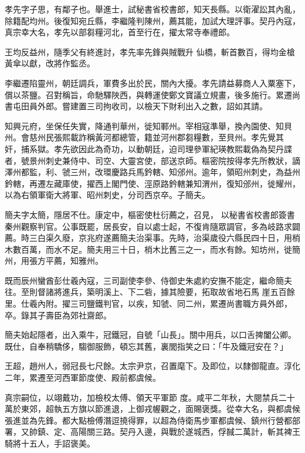 \begin{pinyinscope}
 孝先字子思，有鄰子也。舉進士，試秘書省校書郎，知天長縣。以衛濯訟其內亂，除籍配均州。後復知宛丘縣，李繼隆判陳州，薦其能，加試大理評事。契丹內寇，真宗幸大名，孝先以部芻糧河北，首至行在，擢太常寺奉禮郎。



 王均反益州，隨季父有終進討，孝先率先鋒與賊戰升
 仙橋，斬首數百，得均金槍黃傘以獻，改將作監丞。



 李繼遷陷靈州，朝廷調兵，軍費多出於民，關內大擾。孝先請益募商人入粟塞下，償以茶鹽。召對稱旨，命馳驛陜西，與轉運使鄭文寶議立規畫，後多施行。累遷尚書屯田員外郎。嘗建置三司拘收司，以檢天下財利出入之數，詔如其請。



 知興元府，坐保任失實，降通判華州，徙知鄆州。宰相寇準舉，換內園使、知貝州。會慈州民張熙載詐稱黃河都總管，籍並河州郡芻糧數，至貝州。孝先覺其
 奸，捕系獄。孝先欲因此為奇功，以動朝廷，迫司理參軍紀瑛教熙載偽為契丹諜者，號景州刺史兼侍中、司空、大靈宮使，部送京師。樞密院按得孝先所教狀，謫澤州都監，利、虢三州，改環慶路兵馬鈐轄、知邠州。逾年，領昭州刺史，為益州鈐轄，再遷左藏庫使，擢西上閣門使、涇原路鈐轄兼知渭州，復知邠州，徙耀州，以為右領軍衛大將軍、昭州刺史，分司西京卒。子簡夫。



 簡夫字太簡，隱居不仕。康定中，樞密使杜衍薦之，召見，
 以秘書省校書郎簽書秦州觀察判官。公事既罷，居長安，自以處士起，不復肯隨眾調官，多為岐路求闢薦。時三白渠久廢，京兆府遂薦簡夫治渠事。先時，治渠歲役六縣民四十日，用梢木數百萬，而水不足。簡夫用三十日，梢木比舊三之一，而水有餘。知坊州，徙簡州，用張方平薦，知雅州。



 既而辰州蠻酋彭仕羲內寇，三司副使李參、侍御史朱處約安撫不能定，繼命簡夫往。至則督諸將進兵，築明溪上、下二砦，據其險要，拓取故省地石馬
 崖五百餘里。仕羲內附。擢三司鹽鐵判官，以疾，知虢、同二州，累遷尚書職方員外郎，卒。錄其子壽臣為郊社齋郎。



 簡夫始起隱者，出入乘牛，冠鐵冠，自號「山長」。關中用兵，以口舌捭闔公卿。既仕，自奉稍驕侈，騶御服飾，頓忘其舊，裏閭指笑之曰：「牛及鐵冠安在？」



 王超，趙州人，弱冠長七尺餘。太宗尹京，召置麾下。及即位，以隸御龍直。淳化二年，累遷至河西軍節度使、殿前都虞候。



 真宗嗣位，以翊戴功，加檢校太傅、領天平軍節
 度。咸平二年秋，大閱禁兵二十萬於東郊，超執五方旗以節進退，上御戎幄觀之，面賜褒獎。從幸大名，與都虞候張進並為先鋒。都大點檢傅潛逗撓得罪，以超為侍衛馬步軍都虞候、鎮州行營都部署，又帥鎮、定、高陽關三路。契丹入邊，與戰於遂城西，俘馘二萬計，斬其裨王騎將十五人，手詔褒美。




\end{pinyinscope}
